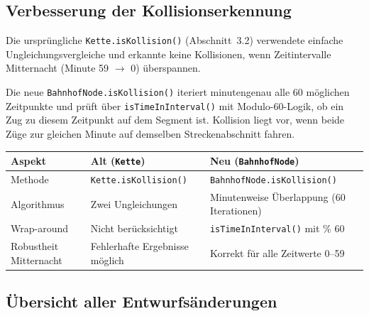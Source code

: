 \documentclass[12pt,a4paper]{article}
\begin{document}
\subsection{Verbesserung der Kollisionserkennung}

Die ursprüngliche \texttt{Kette.isKollision()} (Abschnitt~3.2) verwendete einfache
Ungleichungsvergleiche und erkannte keine Kollisionen, wenn Zeitintervalle
Mitternacht (Minute 59 $\to$ 0) überspannen.

Die neue \texttt{BahnhofNode.isKollision()} iteriert minutengenau alle 60 möglichen
Zeitpunkte und prüft über \texttt{isTimeInInterval()} mit Modulo-60-Logik, ob ein
Zug zu diesem Zeitpunkt auf dem Segment ist. Kollision liegt vor, wenn beide Züge
zur gleichen Minute auf demselben Streckenabschnitt fahren.

\begin{center}
\begin{tabular}{lll}
\toprule
\textbf{Aspekt}            & \textbf{Alt (\texttt{Kette})}      & \textbf{Neu (\texttt{BahnhofNode})}        \\
\midrule
Methode                    & \texttt{Kette.isKollision()}       & \texttt{BahnhofNode.isKollision()}         \\
Algorithmus                & Zwei Ungleichungen                 & Minutenweise Überlappung (60 Iterationen)  \\
Wrap-around                & Nicht berücksichtigt               & \texttt{isTimeInInterval()} mit \% 60      \\
Robustheit Mitternacht     & Fehlerhafte Ergebnisse möglich     & Korrekt für alle Zeitwerte 0–59            \\
\bottomrule
\end{tabular}
\end{center}

\subsection*{Übersicht aller Entwurfsänderungen}
\end{document}
